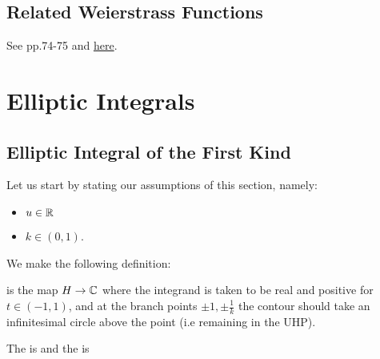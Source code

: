 \documentclass{article}
\begin{document}
\subsection{Related Weierstrass Functions}\label{subsec: related Weierstrass functions}
See \cite{Dubrovin2009} pp.74-75 and \href{https://en.wikipedia.org/wiki/Weierstrass_functions}{here}. 

\section{Elliptic Integrals}

\subsection{Elliptic Integral of the First Kind}
Let us start by stating our assumptions of this section, namely:
\begin{itemize}
	\item $u \in \mathbb{R}$
	\item $k \in (0,1)$.
\end{itemize}

We make the following definition:

\begin{definition}
	 is the map $H\to \mathbb{C}$
	where the integrand is taken to be real and positive for $t \in (-1,1)$, and at the branch points $\pm 1, \pm \frac{1}{k}$ the contour should take an infinitesimal circle above the point (i.e remaining in the UHP). 
\end{definition}

\begin{definition}
	The  is 
	and the  is 
\end{definition}
\end{document}
